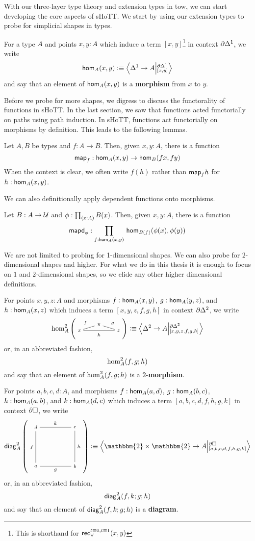 \documentclass[main.tex]{subfiles}
\begin{document}
With our three-layer type theory and extension types in tow, we can start developing the core aspects of sHoTT. We start by using our extension types
to probe for simplicial shapes in types.

\begin{definition}
    For a type $A$ and points $x,y : A$ which induce a term $[x,y]$\footnote{This is shorthand for $\recOr{t \equiv 0, t \equiv 1}{x}{y}$} in context $\pardo$, we write
    $$\ho[A]{x}{y} \defeq \ndexten{\osx}{A}{\pardo}{[x,y]}$$
    and say that an element of $\ho[A]{x}{y}$ is a \textbf{morphism} from $x$ to $y$. 
\end{definition}

Before we probe for more shapes, we digress to discuss the functorality of functions in sHoTT. In the last section, we saw that functions acted functorially on paths using path induction. In sHoTT, functions act functorially on morphisms by definition.
This leads to the following lemmas.
\begin{lemma}
    Let $A,B$ be types and $f : A \to B$. Then, given $x,y : A$, there is a function 
    \[\mapfunc{f} : \ho[A]{x}{y} \to \ho[B]{f x}{f y}\]
    When the context is clear, we often write $f(h)$ rather than $\mapfunc{f}h$ for $h : \ho[A]{x}{y}$.
\end{lemma}
We can also definitionally apply dependent functions onto morphisms.
\begin{lemma}
    Let $B : A \to \U$ and $\phi : \prd{x : A}B(x)$. Then, given $x,y : A$, there is a function
    $$\mapdepfunc{\phi} : \prd{f : \ho[A]{x}{y}}\ho[B(f)]{\phi(x)}{\phi(y)}$$
\end{lemma}
We are not limited to probing for 1-dimensional shapes. We can also probe for $2$-dimensional shapes and higher. For what we do in this thesis it is enough to focus on $1$ and $2$-dimensional shapes, so we elide any other higher dimensional definitions.
\begin{definition}
    For points $x,y,z : A$ and morphisms $f : \ho[A]{x}{y}$, $g : \ho[A]{y}{z}$, and $h : \ho[A]{x}{z}$ which induces a term $[x,y,z,f,g,h]$ in context $\pardt$, we write
    $$\homtwo{A}(x,y,z,f,g,h) \defeq \ndexten{\tsx}{A}{\pardt}{[x,y,z,f,g,h]}$$
    or, in an abbreviated fashion,
    $$\homtwoshort{A}(x,y,z,f,g,h)$$
    and say that an element of $\homtwoshort{A}(x,y,z,f,g,h)$ is a $2$-\textbf{morphism}.
\end{definition}
\begin{definition}
    For points $a,b,c,d : A$, and morphisms $f : \ho[A]{a}{d}$, $g : \ho[A]{b}{c}$, $h : \ho[A]{a}{b}$, and $k : \ho[A]{d}{c}$ which induces a term $[a,b,c,d,f,h,g,k]$ in context $\pards$, we write
    $$\diag{A}(a,b,c,d,f,k,g,h) \defeq \ndexten{\mathbbm{2}\times\mathbbm{2}}{A}{\pards}{[a,b,c,d,f,h,g,k]}$$
    or, in an abbreviated fashion,
    $$\diagshort{A}(a,b,c,d,f,k,g,h)$$
    and say that an element of $\diagshort{A}(a,b,c,d,f,k,g,h)$ is a \textbf{diagram}.
\end{definition}
\end{document}
